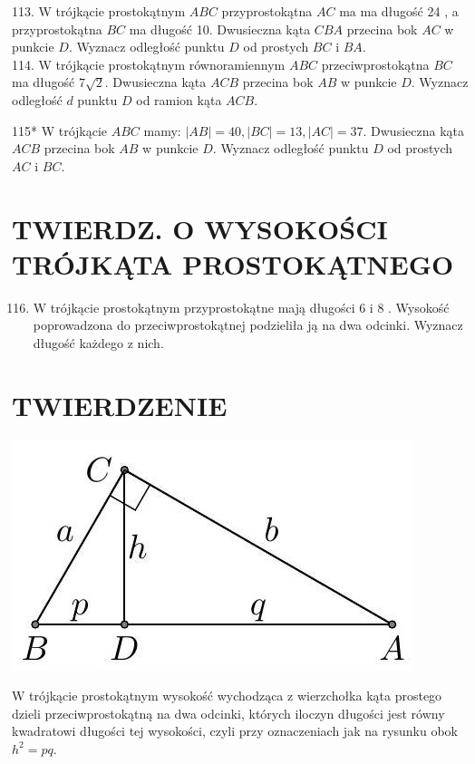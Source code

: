 \documentclass[10pt]{article}
\begin{document}
113. W trójkącie prostokątnym \(A B C\) przyprostokątna \(A C\) ma ma długość 24 , a przyprostokątna \(B C\) ma długość 10. Dwusieczna kąta \(C B A\) przecina bok \(A C\) w punkcie \(D\). Wyznacz odległość punktu \(D\) od prostych \(B C\) i \(B A\).\\
114. W trójkącie prostokątnym równoramiennym \(A B C\) przeciwprostokątna \(B C\) ma długość \(7 \sqrt{2}\). Dwusieczna kąta \(A C B\) przecina bok \(A B\) w punkcie \(D\). Wyznacz odległość \(d\) punktu \(D\) od ramion kąta \(A C B\).

115* W trójkącie \(A B C\) mamy: \(|A B|=40,|B C|=13,|A C|=37\). Dwusieczna kąta \(A C B\) przecina bok \(A B\) w punkcie \(D\). Wyznacz odległość punktu \(D\) od prostych \(A C\) i \(B C\).

\section*{TWIERDZ. O WYSOKOŚCI TRÓJKĄTA PROSTOKĄTNEGO}
\begin{enumerate}
  \setcounter{enumi}{115}
  \item W trójkącie prostokątnym przyprostokątne mają długości 6 i 8 . Wysokość poprowadzona do przeciwprostokątnej podzieliła ją na dwa odcinki. Wyznacz długość każdego z nich.
\end{enumerate}

\section*{TWIERDZENIE}
\begin{center}
\includegraphics[max width=\textwidth]{2024_11_21_71f62bd117d375398909g-143}
\end{center}

W trójkącie prostokątnym wysokość wychodząca z wierzchołka kąta prostego dzieli przeciwprostokątną na dwa odcinki, których iloczyn długości jest równy kwadratowi długości tej wysokości, czyli przy oznaczeniach jak na rysunku obok \(h^{2}=p q\).
\end{document}
